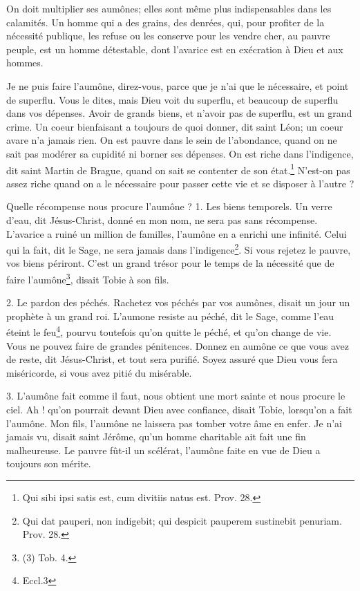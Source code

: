 \documentclass[instructions.tex]{subfiles}
\begin{document}
On doit multiplier ses aumônes; elles sont même plus indispensables dans les calamités. Un homme qui a des grains, des denrées, qui, pour profiter de la nécessité publique, les refuse ou les conserve pour les vendre cher, au pauvre peuple, est un homme détestable, dont l'avarice est en exécration à Dieu et aux hommes.
 
Je ne puis faire l'aumône, direz-vous, parce que je n'ai que le nécessaire, et point de superflu. Vous le dites, mais Dieu voit du superflu, et beaucoup de superflu dans vos dépenses. Avoir de grands biens, et n'avoir pas de superflu, est un grand crime. Un coeur bienfaisant a toujours de quoi donner, dit saint Léon; un coeur avare n'a jamais rien. On est pauvre dans le sein de l'abondance, quand on ne sait pas modérer sa cupidité ni borner ses dépenses. On est riche dans l'indigence, dit saint Martin de Brague, quand on sait se contenter de son état.\footnote{Qui sibi ipsi satis est, cum divitiis natus est. Prov. 28.} N'est-on pas assez riche quand on a le nécessaire pour passer cette vie et se disposer à l'autre ?
 
\tertio Quelle récompense nous procure l'aumône ? 1. Les biens temporels. Un verre d'eau, dit Jésus-Christ, donné en mon nom, ne sera pas sans récompense. L'avarice a ruiné un million de familles, l'aumône en a enrichi une infinité. Celui qui la fait, dit le Sage, ne sera jamais dans l'indigence\footnote{Qui dat pauperi, non indigebit; qui despicit pauperem sustinebit penuriam. Prov. 28.}. Si vous rejetez le pauvre, vos biens périront. C'est un grand trésor pour le temps de la nécessité que de faire l'aumône\footnote{(3) Tob. 4.}, disait Tobie à son fils.
 
2. Le pardon des péchés. Rachetez vos péchés par vos aumônes, disait un jour un prophète à un grand roi. L'aumone resiste au péché, dit le Sage, comme l'eau éteint le feu\footnote{Eccl.3}, pourvu toutefois qu'on quitte le péché, et qu'on change de vie. Vous ne pouvez faire de grandes pénitences. Donnez en aumône ce que vous avez de reste, dit Jésus-Christ, et tout sera purifié. Soyez assuré que Dieu vous fera miséricorde, si vous avez pitié du misérable.
 
3. L'aumône fait comme il faut, nous obtient une mort sainte et nous procure le ciel. Ah ! qu'on pourrait devant Dieu avec confiance, disait Tobie, lorsqu'on a fait l'aumône. Mon fils, l'aumône ne laissera pas tomber votre âme en enfer. Je n'ai jamais vu, disait saint Jérôme, qu'un homme charitable ait fait une fin malheureuse. Le pauvre fût-il un scélérat, l'aumône faite en vue de Dieu a toujours son mérite.
 
\end{document}
